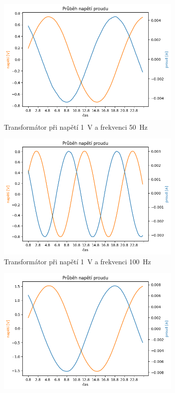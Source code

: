 \documentclass[a4paper]{article}
\begin{document}
\begin{figure}[h!]
	\centering
	\begin{subfigure}{0.49\textwidth}
		\includegraphics[width=\textwidth]{Trafo2b_1V_50Hz.png}
		\caption{Transformátor při napětí \SI{1}{\volt} a frekvenci \SI{50}{\hertz}}
	\end{subfigure}
	\hfill
	\begin{subfigure}{0.49\textwidth}
		\includegraphics[width=\textwidth]{Trafo2b_1V_100Hz.png}
		\caption{Transformátor při napětí \SI{1}{\volt} a frekvenci \SI{100}{\hertz}}
	\end{subfigure}
	\hfill
	\begin{subfigure}{0.49\textwidth}
		\includegraphics[width=\textwidth]{Trafo2b_2V_50Hz.png}

\end{subfigure}
\end{figure}
\end{document}
